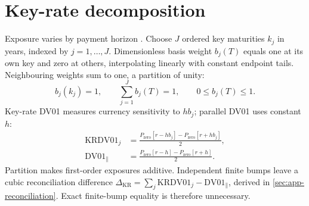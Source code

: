 \section{Key-rate decomposition}\label{sec:keys}
Exposure varies by payment horizon \parencite{ho1992}. Choose \(J\) ordered key maturities \(k_j\) in years, indexed by \(j=1,\ldots,J\). Dimensionless basis weight \(b_j(T)\) equals one at its own key and zero at others, interpolating linearly with constant endpoint tails. Neighbouring weights sum to one, a partition of unity:
\begin{equation}\label{eq:partition}
b_j(k_j)=1,\qquad \sum_{j=1}^J b_j(T)=1,\qquad 0\leq b_j(T)\leq1.
\end{equation}
\label{sec:key-dv01}
Key-rate DV01 measures currency sensitivity to \(hb_j\); parallel DV01 uses constant \(h\):
\begin{align}
\mathrm{KRDV01}_j&=\frac{P_{\mathrm{zero}}[r-hb_j]-P_{\mathrm{zero}}[r+hb_j]}2,\label{eq:key-dv01}\\
\mathrm{DV01}_{\parallel}&=\frac{P_{\mathrm{zero}}[r-h]-P_{\mathrm{zero}}[r+h]}2.\label{eq:parallel-dv01}
\end{align}
\label{sec:reconciliation}
Partition makes first-order exposures additive. Independent finite bumps leave a cubic reconciliation difference \(\Delta_{\mathrm{KR}}=\sum_j\mathrm{KRDV01}_j-\mathrm{DV01}_{\parallel}\), derived in \cref{sec:app-reconciliation}. Exact finite-bump equality is therefore unnecessary.
